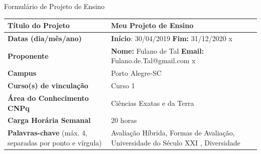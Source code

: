 \documentclass[
  11pt,				
  openright,	
  twoside,	
  a4paper,
  brazil,	
  oldfontcommands,
  ]{abntex2}
\begin{document}
\pagestyle{fancy}

\fancyhf{}
\fancyfoot[RE,RO]{\thepage\xspace de \pageref{DocLastPage}}

\begin{center}
Formulário de Projeto de Ensino
\end{center}

\begin{table}[htp]
\begin{center}
\begin{tabularx}{\textwidth}{|p{5.5cm}|X|}
\hline
\cellcolor{lightgray} \textbf{T\'{i}tulo do Projeto} & Meu Projeto de Ensino \\\hline

\cellcolor{lightgray} \textbf{Datas (dia/mês/ano)} & \hfill \textbf{Início}: 30/04/2019 \hfill \textbf{Fim:} 31/12/2020 \hfill {\color{white}x} \\\hline

\cellcolor{lightgray} \textbf{Proponente} &\hfill \textbf{Nome:} Fulano de Tal \hfill \textbf{Email:} Fulano.de.Tal@gmail.com \hfill {\color{white}x}\\\hline 

\cellcolor{lightgray} \textbf{Campus} &  Porto Alegre-SC \\\hline

\cellcolor{lightgray} \textbf{Curso(s) de vinculação} & Curso 1 \\\hline

\cellcolor{lightgray} \textbf{Área do Conhecimento CNPq} &  Ciências Exatas e da Terra \\\hline

\cellcolor{lightgray} \textbf{Carga Horária Semanal} &  20 horas \\\hline


\cellcolor{lightgray} \textbf{Palavras-chave} {\tiny (máx. 4, separadas por ponto e vírgula)} & Avaliação Híbrida, Formas de Avaliação, Universidade do Século XXI , Diversidade \\\hline

\end{tabularx}
\end{center}
\end{table}
\vspace{-10mm}
\end{document}
